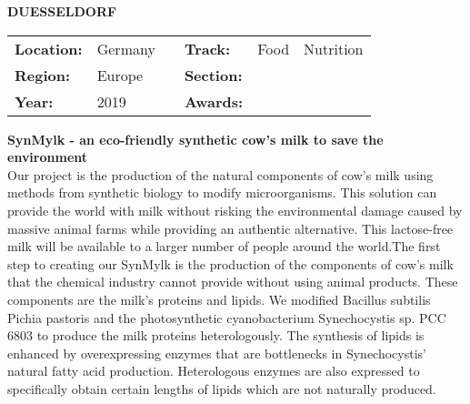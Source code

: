 \textbf{\uppercase{Duesseldorf}} \FloatBarrier \begin{table}[h] \begin{tabular}{lp{2.5cm}llll} \textbf{Location:} & Germany & \multicolumn{1}{|l}{} & \textbf{Track:}   & Food & Nutrition \\ \textbf{Region:}   & Europe   & \multicolumn{1}{|l}{} & \textbf{Section:} &  \\ \textbf{Year:}     & 2019   & \multicolumn{1}{|l}{} & \textbf{Awards:}  & \end{tabular} \end{table} \FloatBarrier \noindent\textbf{SynMylk - an eco-friendly synthetic cow’s milk to save the environment } \vspace{.2cm}\\ 
Our project is the production of the natural components of cow’s milk using methods from synthetic biology to modify microorganisms. This solution can provide the world with milk without risking the environmental damage caused by massive animal farms while providing an authentic alternative. This lactose-free milk will be available to a larger number of people around the world.The first step to creating our SynMylk is the production of the components of cow’s milk that the chemical industry cannot provide without using animal products. These components are the milk’s proteins and lipids. We modified Bacillus subtilis Pichia pastoris and the photosynthetic cyanobacterium Synechocystis sp. PCC 6803 to produce the milk proteins heterologously. The synthesis of lipids is enhanced by overexpressing enzymes that are bottlenecks in Synechocystis’ natural fatty acid production. Heterologous enzymes are also expressed to specifically obtain certain lengths of lipids which are not naturally produced.
\vspace{2cm} $ $
\pagebreak

